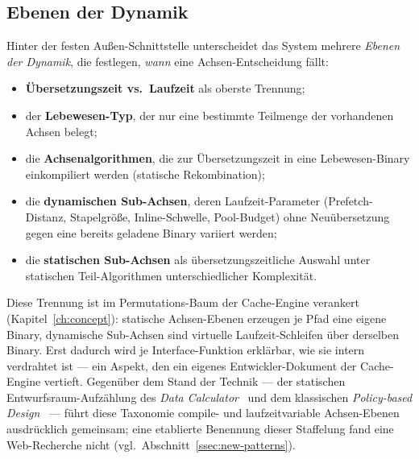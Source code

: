 \subsection{Ebenen der Dynamik}\label{ssec:dynamics-levels}
Hinter der festen Außen-Schnittstelle unterscheidet das System mehrere \emph{Ebenen der Dynamik},
die festlegen, \emph{wann} eine Achsen-Entscheidung fällt:
\begin{itemize}
  \item \textbf{Übersetzungszeit vs.\ Laufzeit} als oberste Trennung;
  \item der \textbf{Lebewesen-Typ}, der nur eine bestimmte Teilmenge der vorhandenen Achsen belegt;
  \item die \textbf{Achsenalgorithmen}, die zur Übersetzungszeit in eine Lebewesen-Binary
  einkompiliert werden (statische Rekombination);
  \item die \textbf{dynamischen Sub-Achsen}, deren Laufzeit-Parameter (Prefetch-Distanz,
  Stapelgröße, Inline-Schwelle, Pool-Budget) ohne Neuübersetzung gegen eine bereits geladene Binary
  variiert werden;
  \item die \textbf{statischen Sub-Achsen} als übersetzungszeitliche Auswahl unter statischen
  Teil-Algorithmen unterschiedlicher Komplexität.
\end{itemize}
Diese Trennung ist im Permutations-Baum der Cache-Engine verankert (Kapitel~\ref{ch:concept}):
statische Achsen-Ebenen erzeugen je Pfad eine eigene Binary, dynamische Sub-Achsen sind virtuelle
Laufzeit-Schleifen über derselben Binary. Erst dadurch wird je Interface-Funktion erklärbar, wie sie
intern verdrahtet ist --- ein Aspekt, den ein eigenes Entwickler-Dokument der Cache-Engine vertieft.
Gegenüber dem Stand der Technik --- der statischen Entwurfsraum-Aufzählung des
\emph{Data Calculator}~\cite{idreos2018datacalculator} und dem klassischen
\emph{Policy-based Design}~\cite{alexandrescu2001modern} --- führt diese Taxonomie compile- und
laufzeitvariable Achsen-Ebenen ausdrücklich gemeinsam; eine etablierte Benennung dieser Staffelung
fand eine Web-Recherche nicht (vgl.\ Abschnitt~\ref{ssec:new-patterns}).

